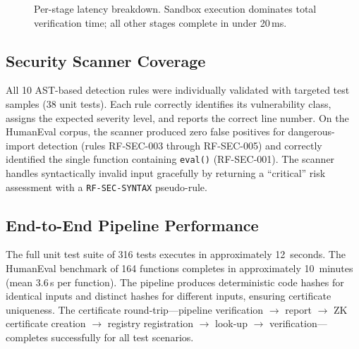 \documentclass[11pt,a4paper]{article}
\begin{document}
\begin{figure}[t]
\centering
{}
\caption{Per-stage latency breakdown.  Sandbox execution dominates total
  verification time; all other stages complete in under 20\,ms.}
\label{fig:latency}
\end{figure}

\subsection{Security Scanner Coverage}

All 10 AST-based detection rules were individually validated with
targeted test samples (38 unit tests).  Each rule correctly identifies
its vulnerability class, assigns the expected severity level, and reports
the correct line number.  On the HumanEval corpus, the scanner produced
zero false positives for dangerous-import detection (rules RF-SEC-003
through RF-SEC-005) and correctly identified the single function
containing \texttt{eval()} (RF-SEC-001).  The scanner handles
syntactically invalid input gracefully by returning a ``critical'' risk
assessment with a \texttt{RF-SEC-SYNTAX} pseudo-rule.

\subsection{End-to-End Pipeline Performance}

The full unit test suite of 316 tests executes in approximately
12~seconds.  The HumanEval benchmark of 164 functions completes in
approximately 10~minutes (mean 3.6\,s per function).  The pipeline
produces deterministic code hashes for identical inputs and distinct
hashes for different inputs, ensuring certificate uniqueness.  The
certificate round-trip---pipeline verification $\rightarrow$ report
$\rightarrow$ ZK certificate creation $\rightarrow$ registry
registration $\rightarrow$ look-up $\rightarrow$
verification---completes successfully for all test scenarios.
\end{document}
